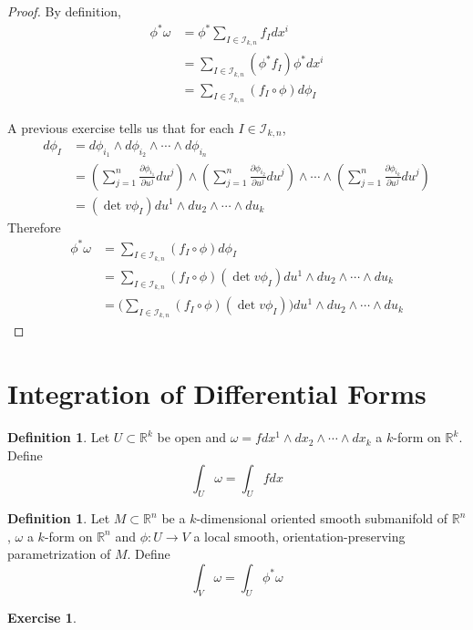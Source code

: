 \documentclass{book}
\theoremstyle{definition}
\newtheorem{defn}[definition]{Definition}
\newtheorem{ex}[definition]{Exercise}
\newcommand{\om}{\omega}
\newcommand{\R}{\mathbb{R}}
\newcommand{\MI}{\mathcal{I}}
\DeclareMathOperator*{\0}{\mbf{0}}
\DeclareMathOperator*{\1}{\mbf{1}}
\newcommand{\p}{\partial}
\begin{document}
	\begin{proof}
		By definition,  
		\begin{align*}
			\phi^* \om 
			&= \phi^*  \sum_{I \in \MI_{k,n}} f_Idx^i \\
			&= \sum_{I \in \MI_{k,n}} (\phi^*f_I) \phi^*dx^i \\
			&= \sum_{I \in \MI_{k,n}} (f_I \circ  \phi)  d\phi_I
		\end{align*}
	
	A previous exercise tells us that for each $I \in \MI_{k,n}$,
	\begin{align*}
		d \phi_I 
		&= d\phi_{i_1} \wedge d\phi_{i_2} \wedge \cdots \wedge d \phi_{i_n} \\
		&= (\sum_{j = 1}^n \frac{\p \phi_{i_1}}{\p u^j} du^j) \wedge (\sum_{j = 1}^n \frac{\p \phi_{i_2}}{\p u^j} du^j) \wedge \cdots \wedge (\sum_{j = 1}^n\frac{\p \phi_{i_k}}{\p u^j}du^j)   \\
		&= (\det v\phi_I)du^1 \wedge du_2 \wedge \cdots \wedge du_k
	\end{align*}
	Therefore 
	\begin{align*}
		\phi^* \om
		&= \sum_{I \in \MI_{k,n}} (f_I \circ  \phi)  d\phi_I \\
		&= \sum_{I \in \MI_{k,n}} (f_I \circ  \phi)  (\det v\phi_I)du^1 \wedge du_2 \wedge \cdots \wedge du_k \\
		&= \bigg(\sum_{I \in \MI_{k,n}} (f_I \circ  \phi)  (\det v\phi_I)\bigg)du^1 \wedge du_2 \wedge \cdots \wedge du_k
	\end{align*}
	\end{proof}
	
	\section{Integration of Differential Forms}
	
	\begin{defn}
		Let $U \subset \R^k$ be open and $\om = f dx^1 \wedge dx_2 \wedge \cdots \wedge dx_k$ a $k$-form on $\R^k$. Define $$\int_U \om = \int_U f dx$$
	\end{defn}
	
	\begin{defn}
		Let $M \subset \R^n$ be a $k$-dimensional oriented smooth submanifold of $\R^n$, $\om$ a $k$-form on $\R^n$ and $\phi: U \rightarrow V$ a local smooth, orientation-preserving parametrization of $M$. Define $$\int_V \om = \int_U \phi^*\om $$
	\end{defn} 

	\begin{ex}
		
	\end{ex}
\end{document}
